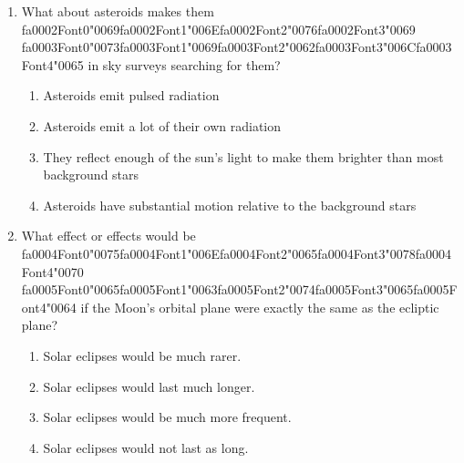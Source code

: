 \documentclass[12pt]{article}
\begin{document}
\begin{enumerate}[label=\arabic*.]
\item What about asteroids makes them {\csname fa0002Font0\endcsname\char"0069}{\csname fa0002Font1\endcsname\char"006E}{\csname fa0002Font2\endcsname\char"0076}{\csname fa0002Font3\endcsname\char"0069} {\csname fa0003Font0\endcsname\char"0073}{\csname fa0003Font1\endcsname\char"0069}{\csname fa0003Font2\endcsname\char"0062}{\csname fa0003Font3\endcsname\char"006C}{\csname fa0003Font4\endcsname\char"0065} in sky surveys searching for them?
\begin{enumerate}[label=(\alph*)]
    \item Asteroids emit pulsed radiation
    \item Asteroids emit a lot of their own radiation
    \item They reflect enough of the sun's light to make them brighter than most background stars
    \item Asteroids have substantial motion relative to the background stars
\end{enumerate}
\item What effect or effects would be {\csname fa0004Font0\endcsname\char"0075}{\csname fa0004Font1\endcsname\char"006E}{\csname fa0004Font2\endcsname\char"0065}{\csname fa0004Font3\endcsname\char"0078}{\csname fa0004Font4\endcsname\char"0070} {\csname fa0005Font0\endcsname\char"0065}{\csname fa0005Font1\endcsname\char"0063}{\csname fa0005Font2\endcsname\char"0074}{\csname fa0005Font3\endcsname\char"0065}{\csname fa0005Font4\endcsname\char"0064} if the Moon's orbital plane were exactly
the same as the ecliptic plane?
\begin{enumerate}[label=(\alph*)]
    \item Solar eclipses would be much rarer.
    \item Solar eclipses would last much longer.
    \item Solar eclipses would be much more frequent.
    \item Solar eclipses would not last as long.
\end{enumerate}
\end{enumerate}
\end{document}
